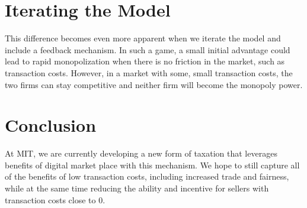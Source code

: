 \documentclass[final,5p,times,twocolumn,11pt]{elsarticle}
\numberwithin{equation}{section} %
\begin{document}
\section{Iterating the Model}
This difference becomes even more apparent when we iterate the model and
include a feedback mechanism. In such a game, a small initial advantage could
lead to rapid monopolization when there is no friction in the market, such as
transaction costs. However, in a market with some, small transaction costs, the
two firms can stay competitive and neither firm will become the monopoly power.

\section{Conclusion}

At MIT, we are currently developing a new form of taxation that leverages
benefits of digital market place with this mechanism. We hope to still capture
all of the benefits of low transaction costs, including increased trade and
fairness, while at the same time reducing the ability and incentive for sellers
with transaction costs close to 0.
\end{document}
